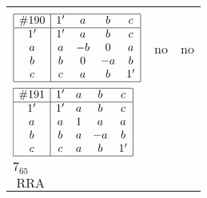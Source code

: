 \documentclass[12pt]{article}
\theoremstyle{definition}
\newcommand\RRA{\operatorname{RRA}}
\newcommand{\id}{{1'}}%
\renewcommand{\top}{1}%
\begin{document}
\begin{center}
\begin{longtable}{l|c|c}
{\begin{tikzpicture}[<->,shorten <=1pt,shorten >=1pt,label distance=0mm, font=\small]
\end{tikzpicture}
}      \\[15mm]

$
\begin{array}{|c|cccc|} \hline
\#190 & \id & a & b & c \\ \hline
\id & \id & a & b & c \\
a & a & -b & 0 & a \\
b & b & 0 & -a & b \\
c & c & a & b & \id \\ \hline
\end{array}
$
 & no  
 & no      \\[15mm]

$
\begin{array}{|c|cccc|} \hline
\#191 & \id & a & b & c \\ \hline
\id & \id & a & b & c \\
a & a & \top & a & a \\
b & b & a & -a & b \\
c & c & a & b & \id \\ \hline
\end{array}
$
 & \begin{tabular}{c} yes \\ $7_{65}$ \\ $\RRA$ \end{tabular} 
 & \adjustbox{valign=c, max height=1.6cm}{$
\left[ \begin{array}{cccccc}
\id & a & a & b & c & b \\ 
a & \id & a & a & a & a \\ 
a & a & \id & a & a & a \\ 
b & a & a & \id & b & b \\ 
c & a & a & b & \id & b \\ 
b & a & a & b & b & \id
\end{array}\right]
$}      \\[15mm]


\end{longtable}
\end{center}
\end{document}
